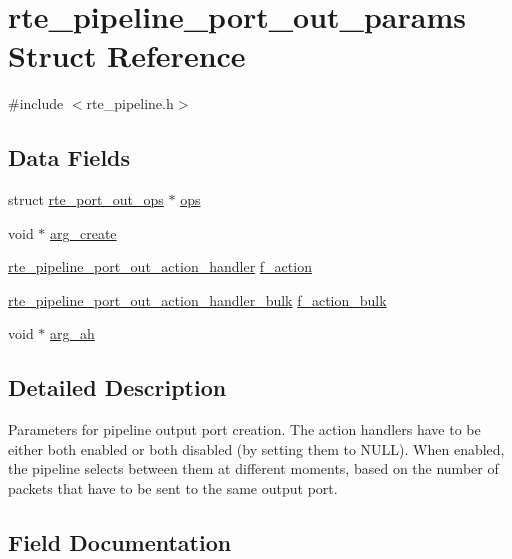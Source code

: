 \hypertarget{structrte__pipeline__port__out__params}{}\section{rte\+\_\+pipeline\+\_\+port\+\_\+out\+\_\+params Struct Reference}
\label{structrte__pipeline__port__out__params}


{\ttfamily \#include $<$rte\+\_\+pipeline.\+h$>$}

\subsection*{Data Fields}
\begin{DoxyCompactItemize}
\item 
struct \hyperlink{structrte__port__out__ops}{rte\+\_\+port\+\_\+out\+\_\+ops} $\ast$ \hyperlink{structrte__pipeline__port__out__params_acbbf5f18df1ca93f322f75ad3dae5e52}{ops}
\item 
void $\ast$ \hyperlink{structrte__pipeline__port__out__params_ab34a217f23d1f5a27ae00e3fbbba445c}{arg\+\_\+create}
\item 
\hyperlink{rte__pipeline_8h_aac89dd501bfc87996c1b6e4172f20ef8}{rte\+\_\+pipeline\+\_\+port\+\_\+out\+\_\+action\+\_\+handler} \hyperlink{structrte__pipeline__port__out__params_aa55f9c3325a2f2a5e9539de6e63235e2}{f\+\_\+action}
\item 
\hyperlink{rte__pipeline_8h_ac50fe92c97ab5095d48a36bd7e869723}{rte\+\_\+pipeline\+\_\+port\+\_\+out\+\_\+action\+\_\+handler\+\_\+bulk} \hyperlink{structrte__pipeline__port__out__params_ab7cce8b3a5b983a8dcedc32acb8d97be}{f\+\_\+action\+\_\+bulk}
\item 
void $\ast$ \hyperlink{structrte__pipeline__port__out__params_adfcedab79c75f0129bd5382cf3d48b13}{arg\+\_\+ah}
\end{DoxyCompactItemize}


\subsection{Detailed Description}
Parameters for pipeline output port creation. The action handlers have to be either both enabled or both disabled (by setting them to N\+U\+L\+L). When enabled, the pipeline selects between them at different moments, based on the number of packets that have to be sent to the same output port. 

\subsection{Field Documentation}
\hypertarget{structrte__pipeline__port__out__params_adfcedab79c75f0129bd5382cf3d48b13}{}
